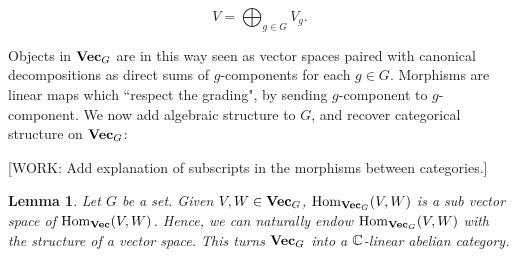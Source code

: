\documentclass{article}
\newtheorem{lemma}{Lemma}[section]
\theoremstyle{definition}
\numberwithin{figure}{section}
\begin{document}
$$V=\bigoplus_{g\in G}V_g.$$

Objects in $\bold{Vec}_G$ are in this way seen as vector spaces paired with canonical decompositions as direct sums of $g$-components for each $g\in G$. Morphisms are linear maps which ``respect the grading", by sending $g$-component to $g$-component. We now add algebraic structure to $G$, and recover categorical structure on $\bold{Vec}_G$:

[WORK: Add explanation of subscripts in the morphisms between categories.]

\begin{lemma} Let $G$ be a set. Given $V,W\in \bold{Vec}_G$, $\mathrm{Hom}_{\bold{Vec}_G}(V,W)$ is a sub vector space of $\mathrm{Hom}_{\bold{Vec}}(V,W)$. Hence, we can naturally endow $\mathrm{Hom}_{\bold{Vec}_G}(V,W)$ with the structure of a vector space. This turns $\bold{Vec}_G$ into a $\mathbb{C}$-linear abelian category.
\end{lemma}
\end{document}

